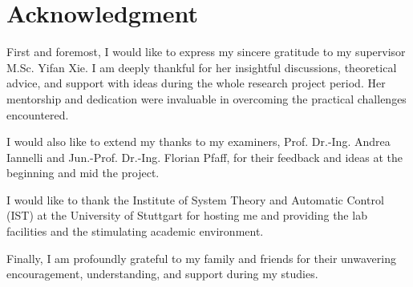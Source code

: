 \chapter*{Acknowledgment}

First and foremost, I would like to express my sincere gratitude to my supervisor M.Sc. Yifan Xie. I am deeply thankful for her insightful discussions, theoretical advice, and support with ideas during the whole research project period. Her mentorship and dedication were invaluable in overcoming the practical challenges encountered.

I would also like to extend my thanks to my examiners, Prof. Dr.-Ing. Andrea Iannelli and Jun.-Prof. Dr.-Ing. Florian Pfaff, for their feedback and ideas at the beginning and mid the project.

I would like to thank the Institute of System Theory and Automatic Control (IST) at the University of Stuttgart for hosting me and providing the lab facilities and the stimulating academic environment.

Finally, I am profoundly grateful to my family and friends for their unwavering encouragement, understanding, and support during my studies.

